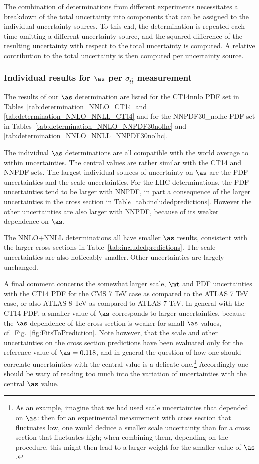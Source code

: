 The combination of determinations from different experiments
necessitates a breakdown of the total uncertainty into components that
can be assigned to the individual uncertainty sources.  To this end,
the determination is repeated each time omitting a different
uncertainty source, and the squared difference of the resulting
uncertainty with respect to the total uncertainty is computed.  A
relative contribution to the total uncertainty is then computed per
uncertainty source. 

\subsubsection{Individual results for $\as$ per $\sigma_{t\bar t}$ measurement}
\label{sec:results-by-exp}

The results of our $\as$ determination are listed for the CT14nnlo
PDF set in Tables~\ref{tab:determination_NNLO_CT14} and
\ref{tab:determination_NNLO_NNLL_CT14} and for the
NNPDF30\_nolhc PDF set in
Tables~\ref{tab:determination_NNLO_NNPDF30nolhc} and
\ref{tab:determination_NNLO_NNLL_NNPDF30nolhc}.

The individual $\as$ determinations are all compatible with the world
average to within uncertainties.
%
The central values are rather similar with the CT14 and NNPDF sets.
%
The largest individual sources of uncertainty on $\as$ are the PDF
uncertainties and the scale uncertainties.
%
For the LHC determinations, the PDF uncertainties tend to be larger
with NNPDF, in part a consequence of the larger uncertainties in the
cross section in Table~\ref{tab:includedpredictions}. 
%
However the other uncertainties are also larger with NNPDF, because
of its weaker dependence on $\as$.

The NNLO+NNLL determinations all have smaller $\as$ results,
consistent with the larger cross sections in
Table~\ref{tab:includedpredictions}.
%
The scale uncertainties are also noticeably smaller.
%
Other uncertainties are largely unchanged.

A final comment concerns the somewhat larger scale, $\mt$ and PDF
uncertainties with the CT14 PDF for the CMS 7 TeV case as compared to
the ATLAS 7 TeV case, or also ATLAS 8 TeV as compared to ATLAS 7 TeV.
%
In general with the CT14 PDF, a smaller value of $\as$ corresponds to
larger uncertainties, because the $\as$ dependence of the cross
section is weaker for small $\as$ values,
cf.~Fig.~\ref{fig:FitsToPrediction}. 
%
Note however, that the scale and other uncertainties on the cross
section predictions have been evaluated only for the reference value
of $\as=0.118$, and in general the question of how one should
correlate uncertainties with the central value is a delicate
one.\footnote{As an example, imagine that we had used scale
  uncertainties that depended on $\as$: then for an experimental
  measurement with cross section that fluctuates low, one would deduce
  a smaller scale uncertainty than for a cross section that fluctuates
  high; when combining them, depending on the procedure, this might
  then lead to a larger weight for the smaller value of $\as$.}
%
Accordingly one should be wary of reading too much into the variation
of uncertainties with the central $\as$ value.


